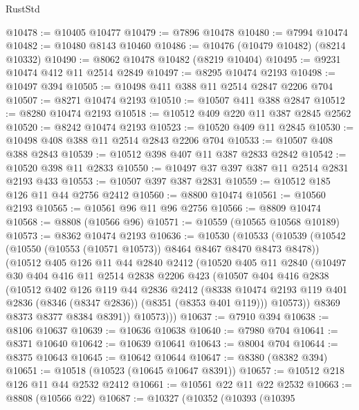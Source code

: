 \begin{lexlean}{RustStd}
\begin{coremodule}
@10478 := @10405 @10477
@10479 := @7896 @10478
@10480 := @7994 @10474
@10482 := @10480 @8143 @10460
@10486 := @10476 (@10479 @10482) (@8214 @10332)
@10490 := @8062 @10478 @10482 (@8219 @10404)
@10495 := @9231 @10474 @412 @11 @2514 @2849
@10497 := @8295 @10474 @2193
@10498 := @10497 @394
@10505 := @10498 @411 @388 @11 @2514 @2847 @2206 @704
@10507 := @8271 @10474 @2193
@10510 := @10507 @411 @388 @2847
@10512 := @8280 @10474 @2193
@10518 := @10512 @409 @220 @11 @387 @2845 @2562
@10520 := @8242 @10474 @2193
@10523 := @10520 @409 @11 @2845
@10530 := @10498 @408 @388 @11 @2514 @2843 @2206 @704
@10533 := @10507 @408 @388 @2843
@10539 := @10512 @398 @407 @11 @387 @2833 @2842
@10542 := @10520 @398 @11 @2833
@10550 := @10497 @37 @397 @387 @11 @2514 @2831 @2193 @433
@10553 := @10507 @397 @387 @2831
@10559 := @10512 @185 @126 @11 @44 @2756 @2412
@10560 := @8800 @10474
@10561 := @10560 @2193
@10565 := @10561 @96 @11 @96 @2756
@10566 := @8809 @10474
@10568 := @8808 (@10566 @96)
@10571 := @10559 (@10565 @10568 @10189)
@10573 := @8362 @10474 @2193
@10636 := @10530
    (@10533
      (@10539
        (@10542 (@10550 (@10553 (@10571 @10573)) @8464 @8467 @8470 @8473 @8478))
        (@10512
          @405
          @126
          @11
          @44
          @2840
          @2412
          (@10520
            @405
            @11
            @2840
            (@10497
              @30
              @404
              @416
              @11
              @2514
              @2838
              @2206
              @423
              (@10507
                @404
                @416
                @2838
                (@10512
                  @402
                  @126
                  @119
                  @44
                  @2836
                  @2412
                  (@8338
                    @10474
                    @2193
                    @119
                    @401
                    @2836
                    (@8346 (@8347 @2836))
                    (@8351 (@8353 @401 @119)))
                  @10573))
              @8369
              @8373
              @8377
              @8384
              @8391))
          @10573)))
@10637 := @7910 @394
@10638 := @8106 @10637
@10639 := @10636 @10638
@10640 := @7980 @704
@10641 := @8371 @10640
@10642 := @10639 @10641
@10643 := @8004 @704
@10644 := @8375 @10643
@10645 := @10642 @10644
@10647 := @8380 (@8382 @394)
@10651 := @10518 (@10523 (@10645 @10647 @8391))
@10657 := @10512 @218 @126 @11 @44 @2532 @2412
@10661 := @10561 @22 @11 @22 @2532
@10663 := @8808 (@10566 @22)
@10687 := @10327
    (@10352
      (@10393
        (@10395

\end{coremodule}
\end{lexlean}
